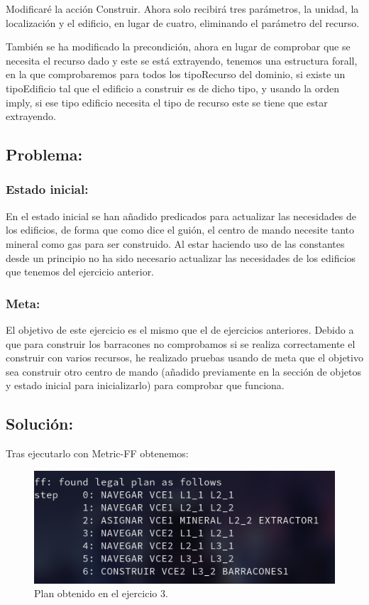 \documentclass[10pt, spanish]{article}
\begin{document}
Modificaré la acción Construir. Ahora solo recibirá tres parámetros, la unidad, la localización y el edificio, en lugar de cuatro, eliminando el parámetro del recurso.

También se ha modificado la precondición, ahora en lugar de comprobar que se necesita el recurso dado y este se está extrayendo, tenemos una estructura forall, en la que comprobaremos para todos los tipoRecurso del dominio, si existe un tipoEdificio tal que el edificio a construir es de dicho tipo, y usando la orden imply, si ese tipo edificio necesita el tipo de recurso este se tiene que estar extrayendo.

\subsection{Problema:}

\subsubsection{Estado inicial:}

En el estado inicial se han añadido predicados para actualizar las necesidades de los edificios, de forma que como dice el guión, el centro de mando necesite tanto mineral como gas para ser construido. Al estar haciendo uso de las constantes desde un principio no ha sido necesario actualizar las necesidades de los edificios que tenemos del ejercicio anterior.

\subsubsection{Meta:}

El objetivo de este ejercicio es el mismo que el de ejercicios anteriores. Debido a que para construir los barracones no comprobamos si se realiza correctamente el construir con varios recursos, he realizado pruebas usando de meta que el objetivo sea construir otro centro de mando (añadido previamente en la sección de objetos y estado inicial para inicializarlo) para comprobar que funciona.

\subsection{Solución:}

Tras ejecutarlo con Metric-FF obtenemos:


\begin{figure}[H]
	\centering
	\includegraphics[scale=0.4]{plan3.png}
	\caption{Plan obtenido en el ejercicio 3.}
	\label{plan3}
\end{figure}
\end{document}

